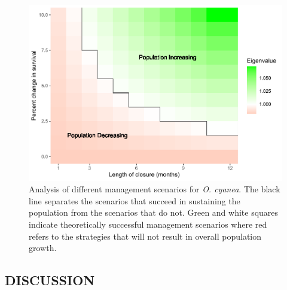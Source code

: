 \documentclass[
  12pt,
]{article}
\begin{document}
\begin{figure}
\centering
\includegraphics{Wulfing_Thesis_files/figure-latex/closures-1.pdf}
\caption{\label{fig:closures}Analysis of different management scenarios for \emph{O. cyanea}. The black line separates the scenarios that succeed in sustaining the population from the scenarios that do not. Green and white squares indicate theoretically successful management scenarios where red refers to the strategies that will not result in overall population growth. \label{closures}}
\end{figure}

\hypertarget{discussion}{%
\subsection{DISCUSSION}\label{discussion}}
\end{document}
